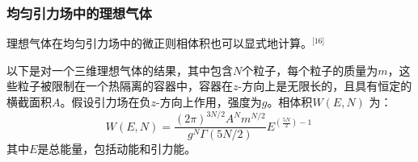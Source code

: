\subsubsection{均匀引力场中的理想气体}  
理想气体在均匀引力场中的微正则相体积也可以显式地计算。\(^\text{[16]}\)

以下是对一个三维理想气体的结果，其中包含\(N\)个粒子，每个粒子的质量为\( m \)，这些粒子被限制在一个热隔离的容器中，容器在\( z \)-方向上是无限长的，且具有恒定的横截面积\(A\)。假设引力场在负\(z\)-方向上作用，强度为\( g \)。相体积\(W(E, N)\) 为：
\[
W(E, N) = \frac{(2\pi)^{3N/2} A^N m^{N/2}}{g^N \Gamma(5N/2)} E^{(\frac{5N}{2}) - 1}~
\]
其中\(E\)是总能量，包括动能和引力能。